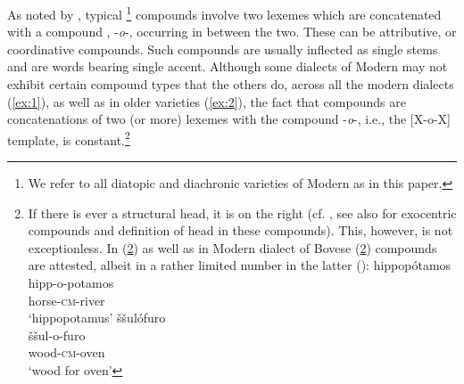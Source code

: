 \documentclass[output=paper]{LSP/langsci}
\begin{document}
 As noted by \citet{Ralli2013moderngreek}, typical \footnote{We refer to all diatopic and diachronic varieties of Modern  as  in this paper.} compounds involve two lexemes which are concatenated with a compound , -\textit{o}-, occurring in between the two. These can be attributive,  or coordinative compounds. Such compounds are usually inflected as single stems and are  words bearing single accent.  Although some dialects of Modern  may not exhibit certain compound types that the others do, across all the modern dialects (\ref{ex:1}),  as well as in older varieties (\ref{ex:2}), the fact that compounds are concatenations of two (or more) lexemes with the compound  -\textit{o}-, i.e., the [X-o-X] template, is constant.\footnote{If there is ever a structural head, it is on the right (cf. \citealt{Ralli2013moderngreek}, see also \citealt{Andreou2014} for exocentric compounds and definition of head in these compounds). This, however, is not exceptionless. In  (\ref{ex:2i}) as well as in Modern  dialect of Bovese (\ref{ex:2ii})  compounds are attested, albeit in a rather limited number in the latter (\citealt{Andreou2014}):
\ea
	\ea\label{ex:2i} \settowidth{}
		\glll hippop\'{o}tamos\\
			  hipp-o-potamos\\
		      horse-\textsc{cm}-river\\ 
		\glt `hippopotamus' 
	\ex\label{ex:2ii}
		\glll \v{s}\v{s}ul\'{o}furo\\
		      \v{s}\v{s}ul-o-furo\\
		      wood-\textsc{cm}-oven\\ 
		\glt `wood for oven'
	\z
\z
 }
 
\end{document}
